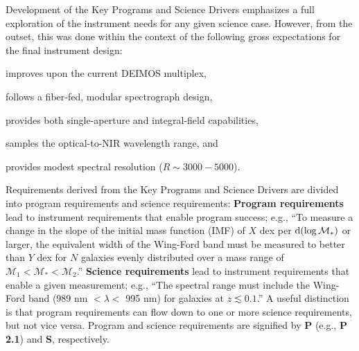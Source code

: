 \documentclass[11pt,a4paper,twoside,onecolumn,openany,final,oldfontcommands]{memoir}
\begin{document}
Development of the Key Programs and Science Drivers emphasizes a full exploration of the instrument needs for any given science case.  However, from the outset, this was done within the context of the following gross expectations for the final instrument design:
%
\begin{asparaenum}
\item improves upon the current DEIMOS multiplex,
\item follows a fiber-fed, modular spectrograph design,
\item provides both single-aperture and integral-field capabilities,
\item samples the optical-to-NIR wavelength range, and
\item provides modest spectral resolution ($R\sim 3000-5000$).
\end{asparaenum}


Requirements derived from the Key Programs and Science Drivers are divided into program requirements and science requirements:  {\bf Program requirements} lead to instrument requirements that enable program success; e.g., ``To measure a change in the slope of the initial mass function (IMF) of $X$ dex per ${\rm d}(\log\mathcal{M}_\ast)$ or larger, the equivalent width of the Wing-Ford band must be measured to better than $Y$ dex for $N$ galaxies evenly distributed over a mass range of $\mathcal{M}_1 < \mathcal{M}_\ast < \mathcal{M}_2$.''  {\bf Science requirements} lead to instrument requirements that enable a given measurement; e.g., ``The spectral range must include the Wing-Ford band (989 nm $< \lambda <$ 995 nm) for galaxies at $z \lesssim 0.1$.''    A useful distinction is that program requirements can flow down to one or more science requirements, but not vice versa. Program and science requirements are signified by {\bf P} (e.g., {\bf P 2.1}) and {\bf S}, respectively.
\end{document}
